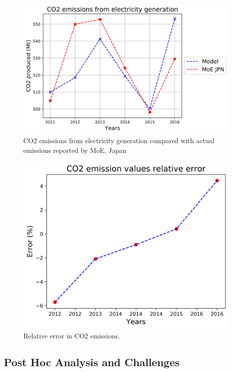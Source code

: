\documentclass[14pt,a4paper]{article} %
\begin{document}
\begin{figure}[H]
\centering
\includegraphics[scale=0.6]{co2-2016}
\caption{CO2 emissions from electricity generation compared with actual emissions reported by \gls{MoE}, Japan}
\end{figure}

\begin{figure}[H] \label{co2err}
\centering
\includegraphics[scale=0.6]{co2-err}
\caption{Relative error in CO2 emissions.}
\end{figure}

\subsection{Post Hoc Analysis and Challenges} 
\end{document}
